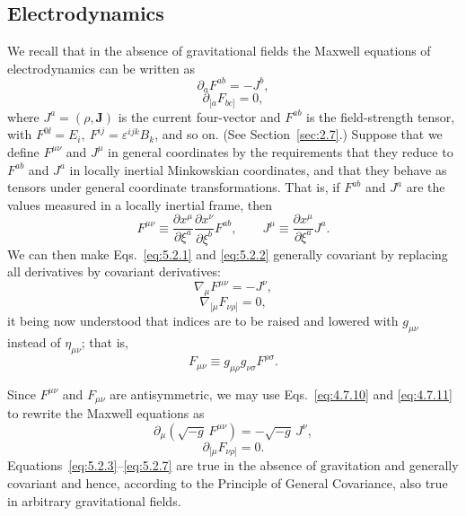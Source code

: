 
\subsection{Electrodynamics}\label{sec:5.2}

We recall that in the absence of gravitational fields the Maxwell equations
of electrodynamics can be written as
\begin{equation}
  \partial_a F^{ab}=-J^b,
  \tag{5.2.1}\label{eq:5.2.1}
\end{equation}
\begin{equation}
  \partial_{[a}F_{bc]}=0,
  \tag{5.2.2}\label{eq:5.2.2}
\end{equation}
where \(J^a=(\rho,\mathbf J)\) is the current four-vector and \(F^{ab}\) is
the field-strength tensor, with
\(F^{0\ii}=E_i,\ F^{ij}=\varepsilon^{ijk}B_k\), and so on. (See
Section~\ref{sec:2.7}.) Suppose that we define \(F^{\mu\nu}\) and \(J^\mu\)
in general coordinates by the requirements that they reduce to \(F^{ab}\)
and \(J^a\) in locally inertial Minkowskian coordinates, and that they behave
as tensors under general coordinate transformations. That is, if \(F^{ab}\)
and \(J^a\) are the values measured in a locally inertial frame, then
\[
  F^{\mu\nu}
  \equiv
  \frac{\partial x^\mu}{\partial\xi^a}
  \frac{\partial x^\nu}{\partial\xi^b}F^{ab},
  \qquad
  J^\mu
  \equiv
  \frac{\partial x^\mu}{\partial\xi^a}J^a.
\]
We can then make Eqs.~\eqref{eq:5.2.1} and \eqref{eq:5.2.2} generally
covariant by replacing all derivatives by covariant derivatives:
\begin{equation}
  \nabla_\mu F^{\mu\nu}=-J^\nu,
  \tag{5.2.3}\label{eq:5.2.3}
\end{equation}
\begin{equation}
  \nabla_{[\mu}F_{\nu\rho]}=0,
  \tag{5.2.4}\label{eq:5.2.4}
\end{equation}
it being now understood that indices are to be raised and lowered with
\(g_{\mu\nu}\) instead of \(\eta_{\mu\nu}\); that is,
\begin{equation}
  F_{\mu\nu}
  \equiv
  g_{\mu\rho}g_{\nu\sigma}F^{\rho\sigma}.
  \tag{5.2.5}\label{eq:5.2.5}
\end{equation}

Since \(F^{\mu\nu}\) and \(F_{\mu\nu}\) are antisymmetric, we may use
Eqs.~\eqref{eq:4.7.10} and \eqref{eq:4.7.11} to rewrite the Maxwell
equations as
\begin{equation}
  \partial_\mu\!\left(\sqrt{-g}\,F^{\mu\nu}\right)
  =
  -\sqrt{-g}\,J^\nu,
  \tag{5.2.6}\label{eq:5.2.6}
\end{equation}
\begin{equation}
  \partial_{[\mu}F_{\nu\rho]}=0.
  \tag{5.2.7}\label{eq:5.2.7}
\end{equation}
Equations~\eqref{eq:5.2.3}--\eqref{eq:5.2.7} are true in the absence of
gravitation and generally covariant and hence, according to the Principle of
General Covariance, also true in arbitrary gravitational fields.

